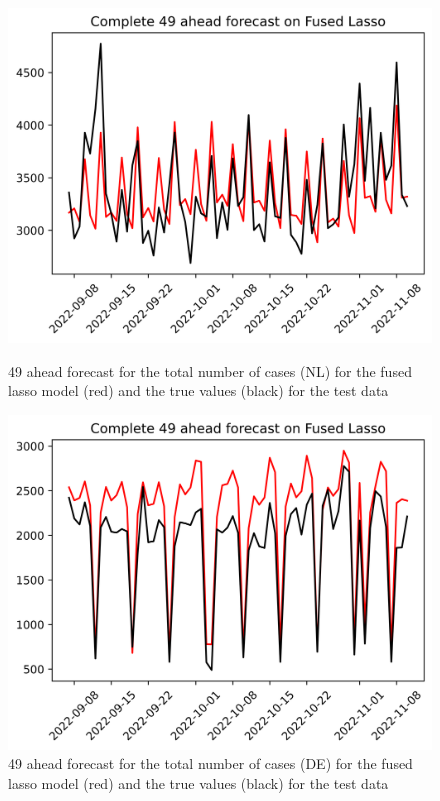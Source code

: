 \begin{figure}

\begin{minipage}{.45\textwidth}
  \centering
  \includegraphics[width=\linewidth]{pics/49_ah/Complete_49_ahead_Fused Lasso.png}
  \caption{49 ahead forecast for the total number of cases (NL) for the fused lasso model (red) and the true values (black) for the test data}
  \label{fig:tot_cases_fc_49_flasso}
\end{minipage}
\begin{minipage}{.45\textwidth}
  \centering
  \includegraphics[width=\linewidth]{pics/49_ah/DE_Complete_49_ahead_Fused Lasso.png}
  \caption{49 ahead forecast for the total number of cases (DE) for the fused lasso model (red) and the true values (black) for the test data}
  \label{fig:tot_cases_fc_49_flasso_DE}
\end{minipage}

\end{figure}
